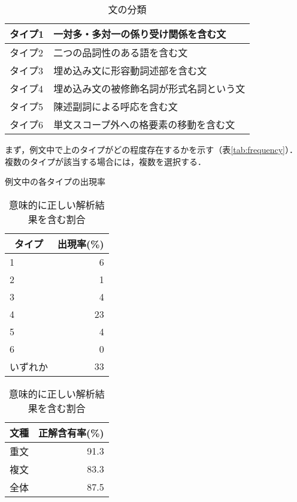 \documentclass[japanese]{jnlp_1.2}
\begin{document}
\begin{table}[b]
  \caption{文の分類}\label{tab:bunrui}
  \centering
  \begin{tabular}{|l|l|} \hline
    タイプ1 & 一対多・多対一の係り受け関係を含む文 \\ \hline
    タイプ2 & 二つの品詞性のある語を含む文 \\ \hline
    タイプ3 & 埋め込み文に形容動詞述部を含む文 \\ \hline
    タイプ4 & 埋め込み文の被修飾名詞が形式名詞という文 \\ \hline
    タイプ5 & 陳述副詞による呼応を含む文 \\ \hline
    タイプ6 & 単文スコープ外への格要素の移動を含む文 \\ \hline
  \end{tabular}
  \end{table}

まず，例文中で上のタイプがどの程度存在するかを示す（表\ref{tab:frequency}）．
複数のタイプが該当する場合には，複数を選択する．

\begin{table}[t]
\begin{minipage}[t]{0.45\textwidth}
  \caption{例文中の各タイプの出現率}\label{tab:frequency}
  \centering
  \begin{tabular}{|l|r|} \hline
    \multicolumn{1}{|c|}{タイプ} & 出現率(\%) \\ \hline\hline
    1      &   6  \\ \hline
    2      &   1  \\ \hline
    3      &   4  \\ \hline
    4      &  23  \\ \hline
    5      &   4  \\ \hline
    6      &   0  \\ \hline \hline
    いずれか & 33  \\ \hline
  \end{tabular}
\end{minipage}
\begin{minipage}[t]{0.45\textwidth}
  \caption{意味的に正しい解析結果を含む割合}\label{tab:precision}
  \centering
  \begin{tabular}{|l|r|} \hline
    文種 & 正解含有率(\%) \\ \hline \hline
    重文 & 91.3 \\ \hline
    複文 & 83.3 \\ \hline \hline
    全体 & 87.5 \\ \hline
  \end{tabular}
\end{minipage}
\vspace{2\baselineskip}
\end{table}
\end{document}
